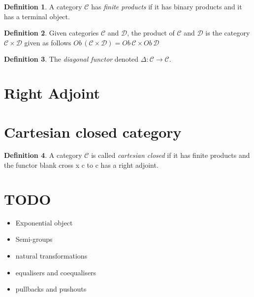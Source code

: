 \documentclass{article}
\theoremstyle{definition}
\newtheorem{definition}{Definition}[section]
\newcommand{\C}{\mathcal{C}}
\newcommand{\D}{\mathcal{D}}
\begin{document}
\begin{definition}
	A category $\C$ has \textit{finite products} if
	it has binary products
	and it has a terminal object.
\end{definition}

\begin{definition}
	Given categories $\C$ and $\D$,
	the product of $\C$ and $\D$ is the category $\C \times \D$
	given as follows $Ob\,(\C \times \D) = Ob\,\C \times Ob\,\D$
\end{definition}

\begin{definition}
	The \textit{diagonal functor} denoted $\Delta : \C \rightarrow \C$.
\end{definition}


\section{Right Adjoint}

\section{Cartesian closed category}

\begin{definition}
	A category $\C$ is called \textit{cartesian closed}
	if it has finite products
	and the functor %
	blank cross x c to c has a right adjoint.
\end{definition}


\section{TODO}
\begin{itemize}
\item Exponential object
\item Semi-groups
\item natural transformations
\item equalisers and coequalisers
\item pullbacks and pushouts
\end{itemize}
\end{document}
